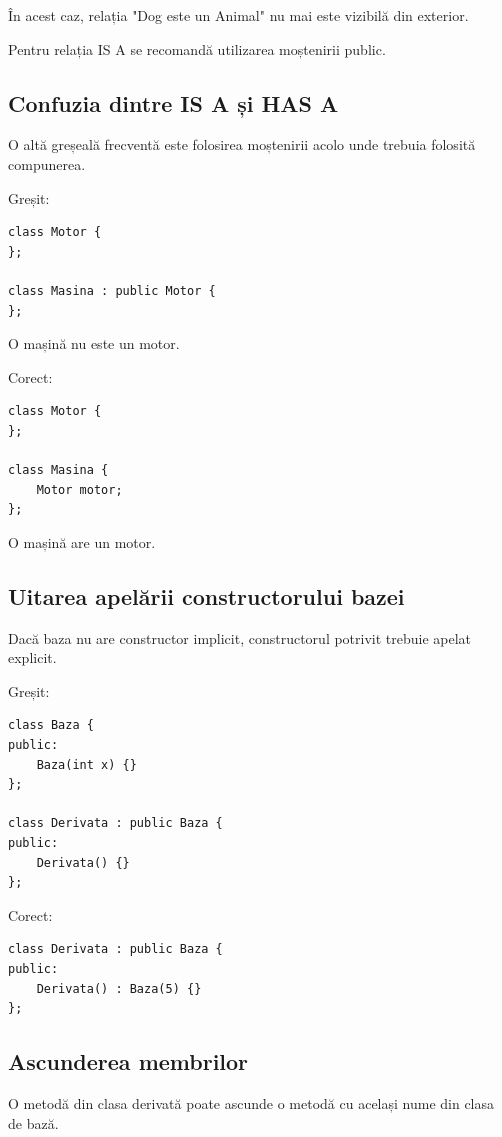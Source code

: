 \documentclass[12pt,a4paper]{article}
\begin{document}
În acest caz, relația "Dog este un Animal" nu mai este vizibilă din exterior.

Pentru relația IS A se recomandă utilizarea moștenirii public.

\subsection{Confuzia dintre IS A și HAS A}

O altă greșeală frecventă este folosirea moștenirii acolo unde trebuia folosită compunerea.

Greșit:

\begin{verbatim}
class Motor {
};

class Masina : public Motor {
};
\end{verbatim}

O mașină nu este un motor.

Corect:

\begin{verbatim}
class Motor {
};

class Masina {
    Motor motor;
};
\end{verbatim}

O mașină are un motor.

\subsection{Uitarea apelării constructorului bazei}

Dacă baza nu are constructor implicit, constructorul potrivit trebuie apelat explicit.

Greșit:

\begin{verbatim}
class Baza {
public:
    Baza(int x) {}
};

class Derivata : public Baza {
public:
    Derivata() {}
};
\end{verbatim}

Corect:

\begin{verbatim}
class Derivata : public Baza {
public:
    Derivata() : Baza(5) {}
};
\end{verbatim}

\subsection{Ascunderea membrilor}

O metodă din clasa derivată poate ascunde o metodă cu același nume din clasa de bază.
\end{document}
